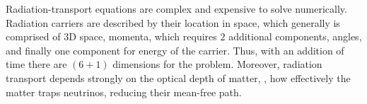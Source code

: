 Radiation-transport equations are complex and expensive to solve numerically. 
Radiation carriers are described by their location in space, which generally is comprised 
of $3$D space, momenta, which requires $2$ additional components, angles, and finally one 
component for energy of the carrier. 
%
Thus, with an addition of time there are $(6+1)$ dimensions for the problem. 
Moreover, radiation transport depends strongly on the optical depth of matter, 
\ie, how effectively the matter traps neutrinos, reducing their mean-free path.
%
%



